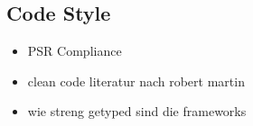 \subsection{Code Style}
\begin{itemize}
    \item PSR Compliance
    \item clean code literatur nach robert martin
    \item wie streng getyped sind die frameworks
\end{itemize}
